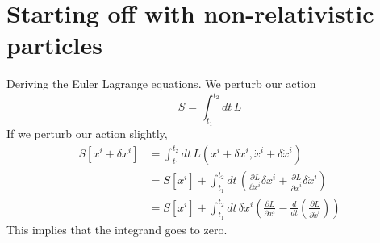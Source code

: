 \section{Starting off with non-relativistic particles} 
Deriving the Euler Lagrange equations. We perturb our action \[ S = \int_{t_1}^{t_2} dt \, L \] 
If we perturb our action slightly, 
\begin{align*} 
 S[x^i + \delta x^i ]& = \int_{t_1}^{t_2} dt \, L( x^i + \delta x^i, \dot{x}^i + \delta  \dot{x}^i ) \\ 
& = S[x^i ] + \int_{t_1}^{t_2} dt \, \left( \frac{ \partial L}{\partial x^i } \delta x^i + \frac{ \partial L }{ \partial \dot{x}^i } \delta \dot{x} ^i \right) \\
& = S[x^i] + \int_{ t_1 }^{t_2} dt \, \delta x^i \left( \frac{ \partial L }{ \partial x^i }  - \frac{d}{dt} \left( \frac{ \partial L }{ \partial \dot{x}^i } \right) \right ) 
\end{align*} 
This implies that the integrand goes to zero. 
